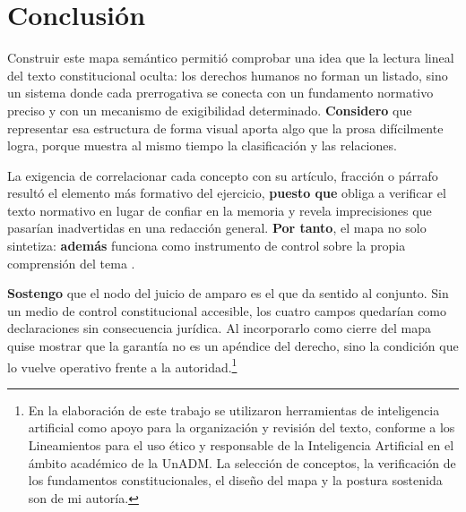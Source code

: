 \documentclass[
  spanish,
  letterpaper, oneside
]{article}
\begin{document}
\clearpage
\section{Conclusión}

Construir este mapa semántico permitió comprobar una idea que la lectura lineal del texto constitucional oculta: los derechos humanos no forman un listado, sino un sistema donde cada prerrogativa se conecta con un fundamento normativo preciso y con un mecanismo de exigibilidad determinado. \textbf{Considero} que representar esa estructura de forma visual aporta algo que la prosa difícilmente logra, porque muestra al mismo tiempo la clasificación y las relaciones.

La exigencia de correlacionar cada concepto con su artículo, fracción o párrafo resultó el elemento más formativo del ejercicio, \textbf{puesto que} obliga a verificar el texto normativo en lugar de confiar en la memoria y revela imprecisiones que pasarían inadvertidas en una redacción general. \textbf{Por tanto}, el mapa no solo sintetiza: \textbf{además} funciona como instrumento de control sobre la propia comprensión del tema \citep{cndhInehrmArticulo1o2015}.

\textbf{Sostengo} que el nodo del juicio de amparo es el que da sentido al conjunto. Sin un medio de control constitucional accesible, los cuatro campos quedarían como declaraciones sin consecuencia jurídica. Al incorporarlo como cierre del mapa quise mostrar que la garantía no es un apéndice del derecho, sino la condición que lo vuelve operativo frente a la autoridad.\footnote{En la elaboración de este trabajo se utilizaron herramientas de inteligencia artificial como apoyo para la organización y revisión del texto, conforme a los Lineamientos para el uso ético y responsable de la Inteligencia Artificial en el ámbito académico de la UnADM. La selección de conceptos, la verificación de los fundamentos constitucionales, el diseño del mapa y la postura sostenida son de mi autoría.}

\clearpage

\end{document}
